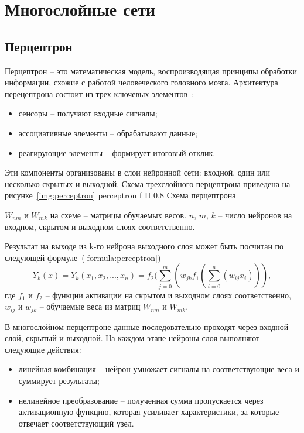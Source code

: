\section{Многослойные сети}
\subsection{Перцептрон}
Перцептрон -- это математическая модель, воспроизводящая принципы обработки информации, схожие с работой человеческого головного мозга. Архитектура перецептрона состоит из трех ключевых элементов~\cite{mfetoum2024multilayer}:
\begin{itemize}
	\item сенсоры -- получают входные сигналы;
	\item ассоциативные элементы -- обрабатывают данные;
	\item реагирующие элементы -- формирует итоговый отклик.
\end{itemize}

Эти компоненты организованы в слои нейронной сети: входной, один или несколько скрытых и выходной.
Схема трехслойного перцептрона приведена на рисунке~\ref{img:perceptron}
{perceptron} %
{f} %
{H} %
{0.8\textwidth} %
{Схема перцептрона} %

$W_{nm}$ и $W_{mk}$ на схеме -- матрицы обучаемых весов. $n$, $m$, $k$ -- число нейронов на входном, скрытом и выходном слоях соответственно. 

Результат на выходе из k-го нейрона выходного слоя может быть посчитан по следующей формуле~(\ref{formula:perceptron})
\begin{equation}\label{formula:perceptron}
	Y_k(x) = Y_k(x_1, x_2, ..., x_n) = f_2(\sum_{j=0}^{m}(w_{jk} f_1(\sum_{i=0}^{n}(w_{ij}x_i))),
\end{equation}
где $f_1$ и $f_2$ -- функции активации на скрытом и выходном слоях соответственно, $w_{ij}$ и $w_{jk}$ -- обучаемые веса из матриц $W_{nm}$ и $W_{mk}$.

В многослойном перцептроне данные последовательно проходят через входной слой, скрытый и выходной.
На каждом этапе нейроны слоя выполняют следующие действия:
\begin{itemize}
	\item линейная комбинация -- нейрон умножает сигналы на соответствующие веса и суммирует результаты;
	\item нелинейное преобразование -- полученная сумма пропускается через активационную функцию, которая усиливает характеристики, за которые отвечает соответствующий узел.
\end{itemize}

